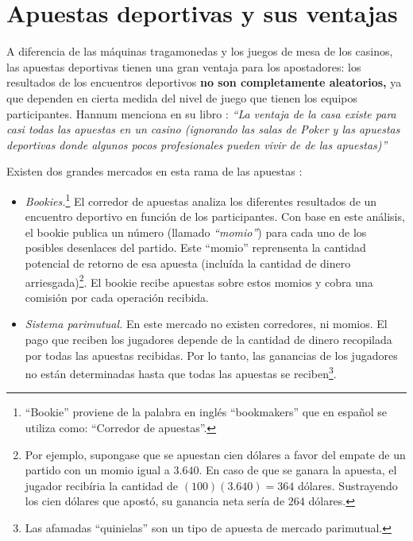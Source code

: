  \section{Apuestas deportivas y sus ventajas}

A diferencia de las máquinas tragamonedas y los juegos de mesa de los casinos, las apuestas deportivas tienen una gran ventaja para los apostadores: los resultados de los encuentros deportivos \textbf{no son completamente aleatorios,} ya que dependen en cierta medida del nivel de juego que tienen los equipos participantes. Hannum menciona en su libro \cite{hannum2005practical} : \emph{``La ventaja de la casa existe para casi todas las apuestas en un casino (ignorando las salas de Poker y las apuestas deportivas donde algunos pocos profesionales pueden vivir de de las apuestas)''}

Existen dos grandes mercados en esta rama de las apuestas \cite{chung2010empirical}:
\begin{itemize} 
	\item \emph{Bookies.}\footnote{``Bookie'' proviene de la palabra en inglés ``bookmakers'' que en español se utiliza como: ``Corredor de apuestas''.} El corredor de apuestas analiza los diferentes resultados de un encuentro deportivo en función de los participantes. Con base en este análisis, el bookie publica un número (llamado \emph{``momio''}) para cada uno de los posibles desenlaces del partido. Este ``momio'' reprensenta la cantidad potencial de retorno de esa apuesta (incluída la cantidad de dinero arriesgada)\footnote{Por ejemplo, supongase que se apuestan cien dólares a favor del empate de un partido con un momio igual a $3.640$. En caso de que se ganara la apuesta, el jugador recibíria la cantidad de $(100)(3.640) = 364$ dólares. Sustrayendo los cien dólares que apostó, su ganancia neta sería de $264$ dólares.}. El bookie recibe apuestas sobre estos momios y cobra una comisión por cada operación recibida. 
	\item \emph{Sistema parimutual.} En este mercado no existen  corredores, ni momios. El pago que reciben los jugadores depende de la cantidad de dinero recopilada por todas las apuestas recibidas. Por lo tanto, las ganancias de los jugadores no están determinadas hasta que todas las apuestas se reciben\footnote{Las afamadas ``quinielas'' son un tipo de apuesta de mercado parimutual.}.
	\end{itemize}

